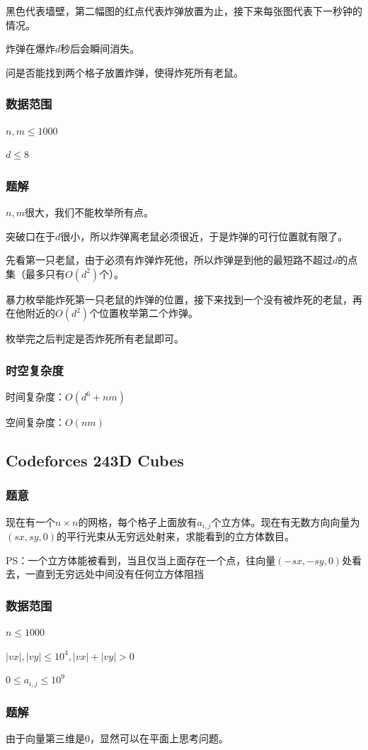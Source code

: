 \documentclass{ctexart}
\begin{document}
黑色代表墙壁，第二幅图的红点代表炸弹放置为止，接下来每张图代表下一秒钟的情况。

炸弹在爆炸$d$秒后会瞬间消失。

问是否能找到两个格子放置炸弹，使得炸死所有老鼠。
\subsubsection{数据范围}
$n,m \le 1000$

$d \le 8$
\subsubsection{题解}
$n,m$很大，我们不能枚举所有点。

突破口在于$d$很小，所以炸弹离老鼠必须很近，于是炸弹的可行位置就有限了。

先看第一只老鼠，由于必须有炸弹炸死他，所以炸弹是到他的最短路不超过$d$的点集（最多只有$O(d^2)$个）。

暴力枚举能炸死第一只老鼠的炸弹的位置，接下来找到一个没有被炸死的老鼠，再在他附近的$O(d^2)$个位置枚举第二个炸弹。

枚举完之后判定是否炸死所有老鼠即可。
\subsubsection{时空复杂度}
时间复杂度：$O(d^6+nm)$

空间复杂度：$O(nm)$
\subsection{Codeforces 243D Cubes}
\subsubsection{题意}
现在有一个$n\times n$的网格，每个格子上面放有$a_{i,j}$个立方体。现在有无数方向向量为$(sx,sy,0)$的平行光束从无穷远处射来，求能看到的立方体数目。

PS：一个立方体能被看到，当且仅当上面存在一个点，往向量$(-sx,-sy,0)$处看去，一直到无穷远处中间没有任何立方体阻挡
\subsubsection{数据范围}
$n \le 1000$

$|vx|,|vy| \le 10^4,|vx|+|vy|>0$

$0\le a_{i,j} \le 10^9$
\subsubsection{题解}
由于向量第三维是$0$，显然可以在平面上思考问题。
\end{document}
